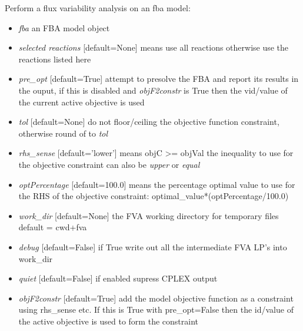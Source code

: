 \documentclass[a4paper,11pt,english]{sphinxmanual}
\begin{document}
\begin{fulllineitems}
\label{modules_doc:cbmpy.CBGLPK.glpk_FluxVariabilityAnalysis}
Perform a flux variability analysis on an fba model:
\begin{itemize}
\item {} 
\emph{fba} an FBA model object

\item {} 
\emph{selected reactions} {[}default=None{]} means use all reactions otherwise use the reactions listed here

\item {} 
\emph{pre\_opt} {[}default=True{]} attempt to presolve the FBA and report its results in the ouput, if this is disabled and \emph{objF2constr} is True then the vid/value of the current active objective is used

\item {} 
\emph{tol}  {[}default=None{]} do not floor/ceiling the objective function constraint, otherwise round of to \emph{tol}

\item {} 
\emph{rhs\_sense} {[}default='lower'{]} means objC \textgreater{}= objVal the inequality to use for the objective constraint can also be \emph{upper} or \emph{equal}

\item {} 
\emph{optPercentage} {[}default=100.0{]} means the percentage optimal value to use for the RHS of the objective constraint: optimal\_value*(optPercentage/100.0)

\item {} 
\emph{work\_dir} {[}default=None{]} the FVA working directory for temporary files default = cwd+fva

\item {} 
\emph{debug} {[}default=False{]} if True write out all the intermediate FVA LP's into work\_dir

\item {} 
\emph{quiet} {[}default=False{]} if enabled supress CPLEX output

\item {} 
\emph{objF2constr} {[}default=True{]} add the model objective function as a constraint using rhs\_sense etc. If
this is True with pre\_opt=False then the id/value of the active objective is used to form the constraint


\end{itemize}
\end{fulllineitems}
\end{document}
